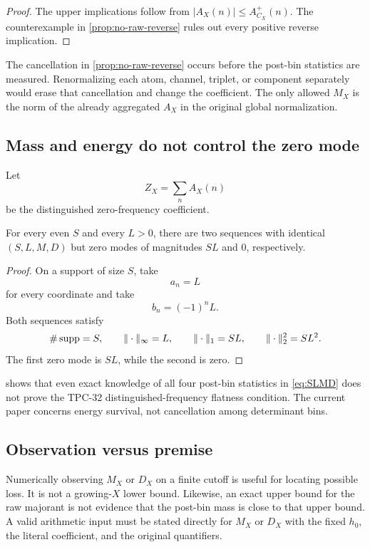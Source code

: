 \begin{proof}
The upper implications follow from
\(|A_X(n)|\le A_{C_X}^+(n)\).  The counterexample in
\cref{prop:no-raw-reverse} rules out every positive reverse
implication.
\end{proof}

\begin{remark}
The cancellation in \cref{prop:no-raw-reverse} occurs before the
post-bin statistics are measured.  Renormalizing each atom, channel,
triplet, or component separately would erase that cancellation and
change the coefficient.  The only allowed \(M_X\) is the norm of the
already aggregated \(A_X\) in the original global normalization.
\end{remark}

\subsection{Mass and energy do not control the zero mode}

Let
\[
 Z_X=\sum_nA_X(n)
\]
be the distinguished zero-frequency coefficient.

\begin{proposition}
\label{prop:norms-not-zero-mode}
For every even \(S\) and every \(L>0\), there are two sequences with
identical \((S,L,M,D)\) but zero modes of magnitudes \(SL\) and
\(0\), respectively.
\end{proposition}

\begin{proof}
On a support of size \(S\), take
\[
 a_n=L
\]
for every coordinate and take
\[
 b_n=(-1)^nL.
\]
Both sequences satisfy
\[
 \#\operatorname{supp}=S,\qquad
 \|\cdot\|_\infty=L,\qquad
 \|\cdot\|_1=SL,\qquad
 \|\cdot\|_2^2=SL^2.
\]
The first zero mode is \(SL\), while the second is zero.
\end{proof}

\begin{remark}
 shows that even exact knowledge of
all four post-bin statistics in \eqref{eq:SLMD} does not prove the
TPC-32 distinguished-frequency flatness condition.  The current
paper concerns energy survival, not cancellation among determinant
bins.
\end{remark}

\subsection{Observation versus premise}

Numerically observing \(M_X\) or \(D_X\) on a finite cutoff is useful
for locating possible loss.  It is not a growing-\(X\) lower bound.
Likewise, an exact upper bound for the raw majorant is not evidence
that the post-bin mass is close to that upper bound.  A valid
arithmetic input must be stated directly for \(M_X\) or \(D_X\) with
the fixed \(h_0\), the literal coefficient, and the original
quantifiers.
